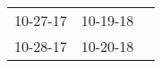 \begin{supertabular}{lll}
 10-27-17\textsuperscript{} &  10-19-18\textsuperscript{} \\
 10-28-17\textsuperscript{} &  10-20-18\textsuperscript{} \\
\end{supertabular}
